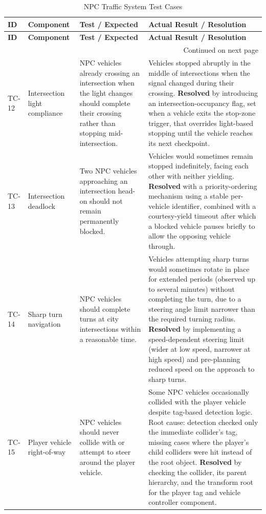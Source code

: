 {\small
\begin{longtable}{|p{1.3cm}|p{3cm}|p{4.5cm}|p{4.5cm}|}
\caption{NPC Traffic System Test Cases}\label{tab:tc_npc}\\
\hline
\textbf{ID} & \textbf{Component} & \textbf{Test / Expected} & \textbf{Actual Result / Resolution} \\ \hline
\endfirsthead
\hline
\textbf{ID} & \textbf{Component} & \textbf{Test / Expected} & \textbf{Actual Result / Resolution} \\ \hline
\endhead
\hline \multicolumn{4}{r}{{Continued on next page}} \\
\endfoot
\endlastfoot

TC-12 & Intersection light compliance & NPC vehicles already crossing an intersection when the light changes should complete their crossing rather than stopping mid-intersection. & Vehicles stopped abruptly in the middle of intersections when the signal changed during their crossing. \textbf{Resolved} by introducing an intersection-occupancy flag, set when a vehicle exits the stop-zone trigger, that overrides light-based stopping until the vehicle reaches its next checkpoint. \\ \hline

TC-13 & Intersection deadlock & Two NPC vehicles approaching an intersection head-on should not remain permanently blocked. & Vehicles would sometimes remain stopped indefinitely, facing each other with neither yielding. \textbf{Resolved} with a priority-ordering mechanism using a stable per-vehicle identifier, combined with a courtesy-yield timeout after which a blocked vehicle pauses briefly to allow the opposing vehicle through. \\ \hline

TC-14 & Sharp turn navigation & NPC vehicles should complete turns at city intersections within a reasonable time. & Vehicles attempting sharp turns would sometimes rotate in place for extended periods (observed up to several minutes) without completing the turn, due to a steering angle limit narrower than the required turning radius. \textbf{Resolved} by implementing a speed-dependent steering limit (wider at low speed, narrower at high speed) and pre-planning reduced speed on the approach to sharp turns. \\ \hline

TC-15 & Player vehicle right-of-way & NPC vehicles should never collide with or attempt to steer around the player vehicle. & Some NPC vehicles occasionally collided with the player vehicle despite tag-based detection logic. Root cause: detection checked only the immediate collider's tag, missing cases where the player's child colliders were hit instead of the root object. \textbf{Resolved} by checking the collider, its parent hierarchy, and the transform root for the player tag and vehicle controller component. \\ \hline


\end{longtable}}
